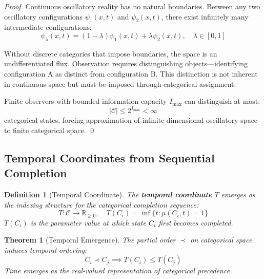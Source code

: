\documentclass[12pt,a4paper]{article}
\newtheorem{theorem}{Theorem}
\newtheorem{definition}{Definition}
\begin{document}
\begin{proof}
Continuous oscillatory reality has no natural boundaries. Between any two oscillatory configurations $\psi_1(x,t)$ and $\psi_2(x,t)$, there exist infinitely many intermediate configurations:
\begin{equation}
\psi_\lambda(x,t) = (1-\lambda)\psi_1(x,t) + \lambda\psi_2(x,t), \quad \lambda \in [0,1]
\end{equation}

Without discrete categories that impose boundaries, the space is an undifferentiated flux. Observation requires distinguishing objects—identifying configuration A as distinct from configuration B. This distinction is not inherent in continuous space but must be imposed through categorical assignment.

Finite observers with bounded information capacity $I_{\text{max}}$ can distinguish at most:
\begin{equation}
|\mathcal{C}| \leq 2^{I_{\text{max}}} < \infty
\end{equation}
categorical states, forcing approximation of infinite-dimensional oscillatory space to finite categorical space. \qed
\end{proof}

\subsection{Temporal Coordinates from Sequential Completion}

\begin{definition}[Temporal Coordinate]
\label{def:temporal_coordinate}
The \textbf{temporal coordinate} $T$ emerges as the indexing structure for the categorical completion sequence:
\begin{equation}
T: \mathcal{C} \to \mathbb{R}_{\geq 0}, \quad T(C_i) = \inf\{t : \mu(C_i, t) = 1\}
\end{equation}
$T(C_i)$ is the parameter value at which state $C_i$ first becomes completed.
\end{definition}

\begin{theorem}[Temporal Emergence]
\label{thm:temporal_emergence}
The partial order $\prec$ on categorical space induces temporal ordering:
\begin{equation}
C_i \prec C_j \implies T(C_i) \leq T(C_j)
\end{equation}
Time emerges as the real-valued representation of categorical precedence.
\end{theorem}
\end{document}
